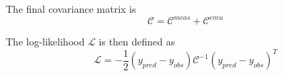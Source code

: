 \documentclass[12pt]{article}
\begin{document}
The final covariance matrix is
\begin{equation}
    \mathcal{C} = \mathcal{C}^{meas} + \mathcal{C}^{emu}
\end{equation}


The log-likelihood $\mathcal{L}$ is then defined as 
\begin{equation}
    \mathcal{L} = -\frac{1}{2} (y_{pred} - y_{obs}) \mathcal{C}^{-1} (y_{pred} - y_{obs})^T
\end{equation}
\end{document}
